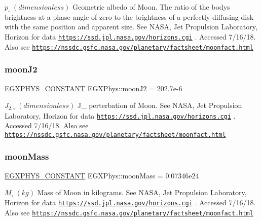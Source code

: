 $ p_{\circ} \ (dimensionless)$ Geometric albedo of Moon. The ratio of the body\textquotesingle{}s brightness at a phase angle of zero to the brightness of a perfectly diffusing disk with the same position and apparent size. See N\+A\+SA, Jet Propulsion Laboratory, Horizon for data \href{https://ssd.jpl.nasa.gov/horizons.cgi}{\tt https\+://ssd.\+jpl.\+nasa.\+gov/horizons.\+cgi} . Accessed 7/16/18. Also see \href{https://nssdc.gsfc.nasa.gov/planetary/factsheet/moonfact.html}{\tt https\+://nssdc.\+gsfc.\+nasa.\+gov/planetary/factsheet/moonfact.\+html} \mbox{\label{group___e_g_x_phys-_constants-_astrophysics-_solar_system-_moon-_bulk_gabc4f68e3f15df659732dace60ffa5948}} 
\subsubsection{\texorpdfstring{moon\+J2}{moonJ2}}
{\footnotesize\ttfamily \mbox{\hyperlink{group___e_g_x_phys-_constants-_macros_ga76980d288494ce1714c9ac68a95ba702}{E\+G\+X\+P\+H\+Y\+S\+\_\+\+C\+O\+N\+S\+T\+A\+NT}} E\+G\+X\+Phys\+::moon\+J2 = 202.\+7e-\/6}

$ J_{2,\circ} \ (dimensionless)$ J\+\_ perterbation of Moon. See N\+A\+SA, Jet Propulsion Laboratory, Horizon for data \href{https://ssd.jpl.nasa.gov/horizons.cgi}{\tt https\+://ssd.\+jpl.\+nasa.\+gov/horizons.\+cgi} . Accessed 7/16/18. Also see \href{https://nssdc.gsfc.nasa.gov/planetary/factsheet/moonfact.html}{\tt https\+://nssdc.\+gsfc.\+nasa.\+gov/planetary/factsheet/moonfact.\+html} \mbox{\label{group___e_g_x_phys-_constants-_astrophysics-_solar_system-_moon-_bulk_ga0e4476345121e793942cc7c233aaaf9e}} 
\subsubsection{\texorpdfstring{moon\+Mass}{moonMass}}
{\footnotesize\ttfamily \mbox{\hyperlink{group___e_g_x_phys-_constants-_macros_ga76980d288494ce1714c9ac68a95ba702}{E\+G\+X\+P\+H\+Y\+S\+\_\+\+C\+O\+N\+S\+T\+A\+NT}} E\+G\+X\+Phys\+::moon\+Mass = 0.\+07346e24}

$M_{\circ} \ (kg)$ Mass of Moon in kilograms. See N\+A\+SA, Jet Propulsion Laboratory, Horizon for data \href{https://ssd.jpl.nasa.gov/horizons.cgi}{\tt https\+://ssd.\+jpl.\+nasa.\+gov/horizons.\+cgi} . Accessed 7/16/18. Also see \href{https://nssdc.gsfc.nasa.gov/planetary/factsheet/moonfact.html}{\tt https\+://nssdc.\+gsfc.\+nasa.\+gov/planetary/factsheet/moonfact.\+html} \mbox{\label{group___e_g_x_phys-_constants-_astrophysics-_solar_system-_moon-_bulk_gabc75a86c039f1b5b3925c982e2b66439}} 
